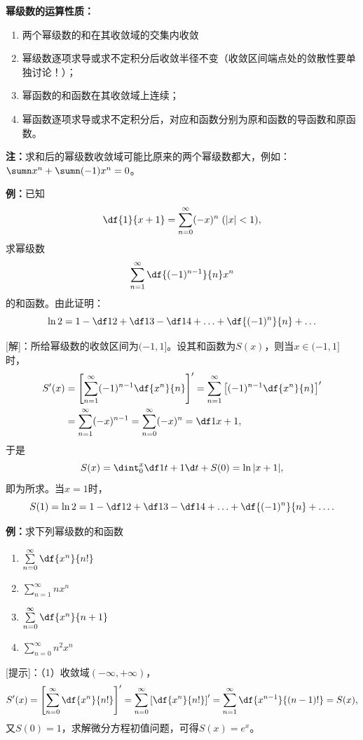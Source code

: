 \begin{thx}
	{\bf 幂级数的运算性质：}
	\begin{enumerate}
	  \item 两个幂级数的和在其收敛域的交集内收敛
	  \item 幂级数逐项求导或求不定积分后收敛半径不变（收敛区间端点处的敛散性要单独讨论！）；
	  \item 幂函数的和函数在其收敛域上连续；
	  \item 幂函数逐项求导或求不定积分后，对应和函数分别为原和函数的导函数和原函数。
	\end{enumerate}
\end{thx}

{\bf 注：}求和后的幂级数收敛域可能比原来的两个幂级数都大，例如：$\sumn x^n+\sumn(-1)x^n=0$。

{\bf 例：}已知
$$\df{1}{x+1}=\sum\limits_{n=0}^{\infty}(-x)^n\;(|x|<1),$$
求幂级数
$$\sum\limits_{n=1}^{\infty}\df{(-1)^{n-1}}{n}x^n$$
的和函数。由此证明：
$$\ln 2=1-\df 12+\df 13-\df 14+\ldots+\df{(-1)^n}{n}+\ldots$$

[解]：所给幂级数的收敛区间为$(-1,1]$。设其和函数为$S(x)$，则当$x\in(-1,1]$时，
\begin{align*}
	S'(x)&=\left[\sum\limits_{n=1}^{\infty}(-1)^{n-1}\df{x^n}{n}\right]'
	=\sum\limits_{n=1}^{\infty}\left[(-1)^{n-1}\df{x^n}{n}\right]'\\
	&=\sum\limits_{n=1}^{\infty}(-x)^{n-1}
	=\sum\limits_{n=0}^{\infty}(-x)^{n}=\df1{x+1},
\end{align*}
于是
$$S(x)=\dint_0^x\df1{t+1}\d t+S(0)=\ln|x+1|,$$
即为所求。当$x=1$时，
$$S(1)=\ln 2=1-\df 12+\df 13-\df 14+\ldots+\df{(-1)^n}{n}+\ldots.$$
\fin

{\bf 例：}求下列幂级数的和函数
\begin{enumerate}[(1)]
  \setlength{\itemindent}{1cm}
  \item $\sum\limits_{n=0}^{\infty}\df{x^n}{n!}$
  \item $\sum\limits_{n=1}^{\infty}nx^n$
  \item $\sum\limits_{n=0}^{\infty}\df{x^n}{n+1}$
  \item $\sum\limits_{n=0}^{\infty}n^2x^n$
\end{enumerate}

[提示]：（1）收敛域$(-\infty,+\infty)$，
$$S'(x)=\left[\sum\limits_{n=0}^{\infty}\df{x^n}{n!}\right]'
=\sum\limits_{n=0}^{\infty}\left[\df{x^n}{n!}\right]'
=\sum\limits_{n=1}^{\infty}\df{x^{n-1}}{(n-1)!}=S(x),$$
又$S(0)=1$，求解微分方程初值问题，可得$S(x)=e^x$。

